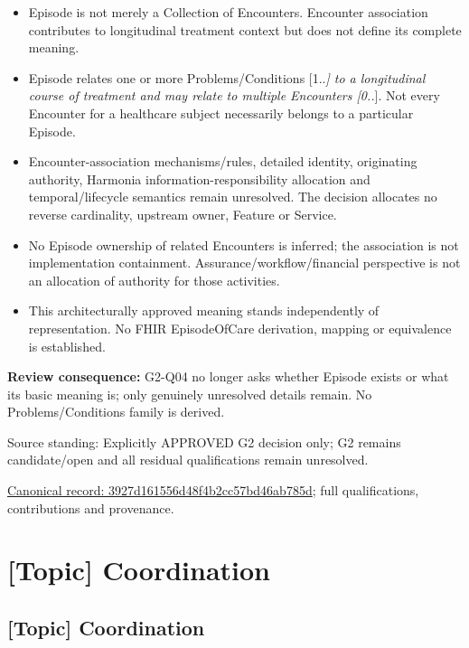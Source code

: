 \begin{itemize}


\item Episode is not merely a Collection of Encounters. Encounter association contributes to longitudinal treatment context but does not define its complete meaning.

\item Episode relates one or more Problems/Conditions [1..\emph{] to a longitudinal course of treatment and may relate to multiple Encounters [0..}]. Not every Encounter for a healthcare subject necessarily belongs to a particular Episode.

\item Encounter-association mechanisms/rules, detailed identity, originating authority, Harmonia information-responsibility allocation and temporal/lifecycle semantics remain unresolved. The decision allocates no reverse cardinality, upstream owner, Feature or Service.

\item No Episode ownership of related Encounters is inferred; the association is not implementation containment. Assurance/workflow/financial perspective is not an allocation of authority for those activities.

\item This architecturally approved meaning stands independently of representation. No FHIR EpisodeOfCare derivation, mapping or equivalence is established.

\end{itemize}


\textbf{Review consequence:} G2-Q04 no longer asks whether Episode exists or what its basic meaning is; only genuinely unresolved details remain. No Problems/Conditions family is derived.



Source standing: Explicitly APPROVED G2 decision only; G2 remains candidate/open and all residual qualifications remain unresolved.


{\footnotesize \href{../../../../continuum/application/data-object/topic/3927d161556d48f4b2cc57bd46ab785d.md}{Canonical record: 3927d161556d48f4b2cc57bd46ab785d}; full qualifications, contributions and provenance.}\par
\section{[Topic] Coordination}

\subsection{[Topic] Coordination}

